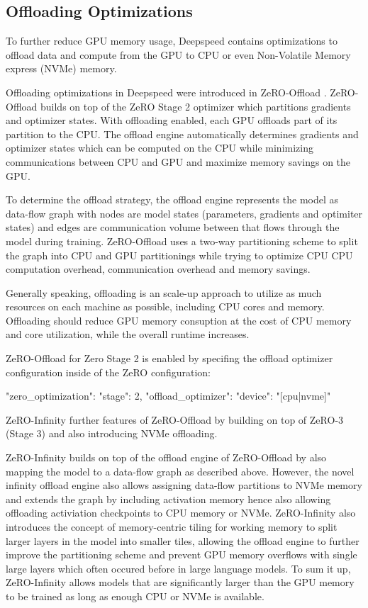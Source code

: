 \subsection{Offloading Optimizations}
\label{subsection:offloading}

To further reduce GPU memory usage, Deepspeed contains optimizations to offload 
data and compute from the GPU to CPU or even Non-Volatile Memory express (NVMe) 
memory. 

Offloading optimizations in Deepspeed were introduced in ZeRO-Offload 
\cite*{DBLP:journals/corr/abs-2101-06840}. ZeRO-Offload builds on top of 
the ZeRO Stage 2 optimizer which partitions gradients and optimizer states. 
With offloading enabled, each GPU offloads part of its partition to the CPU. 
The offload engine automatically determines gradients and optimizer states 
which can be computed on the CPU while minimizing communications between CPU 
and GPU and maximize memory savings on the GPU.

To determine the offload strategy, the offload engine represents the model as 
data-flow graph with nodes are model states (parameters, gradients and 
optimiter states) and edges are communication volume between that flows through 
the model during training. ZeRO-Offload uses a two-way partitioning scheme to 
split the graph into CPU and GPU partitionings while trying to optimize CPU 
CPU computation overhead, communication overhead and memory savings. 

Generally speaking, offloading is an scale-up approach to utilize as much 
resources on each machine as possible, including CPU cores and memory. 
Offloading should reduce GPU memory consuption at the cost of CPU memory and 
core utilization, while the overall runtime increases.

ZeRO-Offload for Zero Stage 2 is enabled by specifing the offload optimizer 
configuration inside of the ZeRO configuration:

\begin{json}
{
    "zero_optimization": {
        "stage": 2,
        "offload_optimizer": {
            "device": "[cpu|nvme]"
        }
    }
}
\end{json}

ZeRO-Infinity \cite*{DBLP:journals/corr/abs-2104-07857} further features of 
ZeRO-Offload by building on top of ZeRO-3 (Stage 3) and also introducing NVMe 
offloading.

ZeRO-Infinity builds on top of the offload engine of ZeRO-Offload by also 
mapping the model to a data-flow graph as described above. However, the 
novel infinity offload engine also allows assigning data-flow partitions 
to NVMe memory and extends the graph by including activation memory hence 
also allowing offloading activiation checkpoints to CPU memory or NVMe. 
ZeRO-Infinity also introduces the concept of memory-centric tiling for 
working memory to split larger layers in the model into smaller tiles, 
allowing the offload engine to further improve the partitioning scheme and 
prevent GPU memory overflows with single large layers which often occured 
before in large language models.   To sum it up, ZeRO-Infinity allows 
models that are significantly larger than the GPU memory to be trained as 
long as enough CPU or NVMe is available. 

